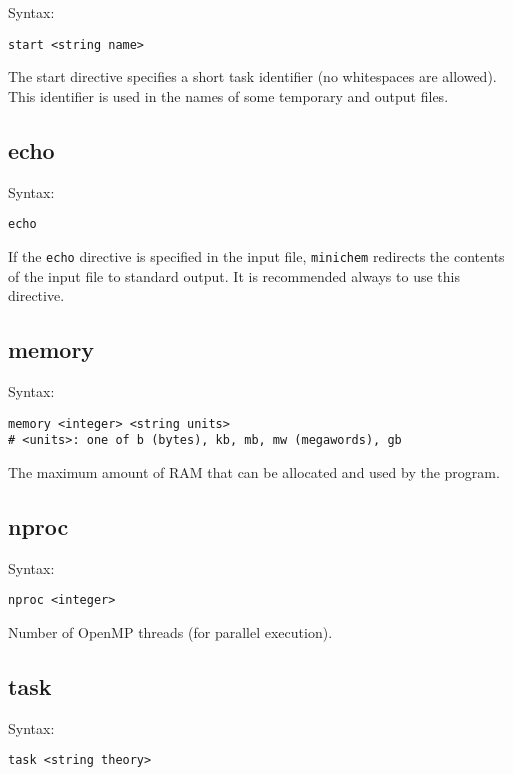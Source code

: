 \documentclass[a4paper, 12pt]{article}
\begin{document}
Syntax:

\begin{lstlisting}
start <string name>
\end{lstlisting}

The start directive specifies a short task identifier (no whitespaces are allowed). This identifier is used in the names of some temporary and output files.

\subsection{echo}

Syntax:

\begin{lstlisting}
echo
\end{lstlisting}

If the \texttt{echo} directive is specified in the input file, \texttt{minichem} redirects the contents of the input file to standard output. It is recommended always to use this directive.

\subsection{memory}

Syntax:

\begin{lstlisting}
memory <integer> <string units>
# <units>: one of b (bytes), kb, mb, mw (megawords), gb
\end{lstlisting}

The maximum amount of RAM that can be allocated and used by the program.

\subsection{nproc}

Syntax:

\begin{lstlisting}
nproc <integer>
\end{lstlisting}

Number of OpenMP threads (for parallel execution).

\subsection{task}

Syntax:

\begin{lstlisting}
task <string theory>
\end{lstlisting}
\end{document}

